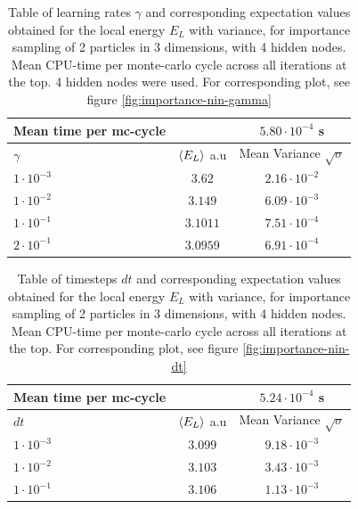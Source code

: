 \begin{table}[h]
\begin{tabular}{l c c}
	Mean time per mc-cycle & &$5.80\cdot10^{-4}$ s \\
	\hline
	$\gamma$ & $\langle E_L \rangle$ a.u & Mean Variance $\sqrt{\sigma}$\\
	\hline
	$1\cdot10^{-3}$ & $3.62$ & $2.16\cdot10^{-2}$ \\
	$1\cdot10^{-2}$ & $3.149$ & $6.09\cdot10^{-3}$ \\
	$1\cdot10^{-1}$ & $3.1011$ & $7.51\cdot10^{-4}$ \\
	$2\cdot10^{-1}$ & $3.0959$ & $6.91\cdot10^{-4}$ \\
\end{tabular}
\label{tab:importance-nin-gamma}
\caption{Table of learning rates $\gamma$ and corresponding expectation values obtained for the local energy $E_L$ with variance, for importance sampling
		of 2 particles in 3 dimensions, with 4 hidden nodes.
		Mean CPU-time per monte-carlo cycle across all iterations at the top. 4 hidden nodes were used.
	For corresponding plot, see figure \ref{fig:importance-nin-gamma}}
\end{table}

\begin{table}[h]
\begin{tabular}{l c c}
	Mean time per mc-cycle & & $5.24\cdot10^{-4}$ s \\
	\hline
	$dt$ & $\langle E_L \rangle$ a.u & Mean Variance $\sqrt{\sigma}$\\
	\hline
	$1\cdot10^{-3}$ & $3.099$ & $9.18\cdot10^{-3}$ \\
	$1\cdot10^{-2}$ & $3.103$ & $3.43\cdot10^{-3}$ \\
	$1\cdot10^{-1}$ & $3.106$ & $1.13\cdot10^{-3}$ \\
\end{tabular}
\label{tab:importance-nin-dt}
\caption{Table of timesteps $dt$ and corresponding expectation values obtained for the local energy $E_L$ with variance, for importance sampling
		of 2 particles in 3 dimensions, with 4 hidden nodes.
		Mean CPU-time per monte-carlo cycle across all iterations at the top.
	For corresponding plot, see figure \ref{fig:importance-nin-dt}}
\end{table}

